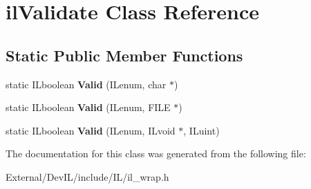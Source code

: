 \hypertarget{classilValidate}{
\section{ilValidate Class Reference}
\label{classilValidate}
}
\subsection*{Static Public Member Functions}
\begin{DoxyCompactItemize}
\item 
\hypertarget{classilValidate_a7a870c444e89b6dcbe05cf05a35f4911}{
static ILboolean {\bfseries Valid} (ILenum, char $\ast$)}
\label{classilValidate_a7a870c444e89b6dcbe05cf05a35f4911}

\item 
\hypertarget{classilValidate_ae3095a0f6efb478ac460725d44868145}{
static ILboolean {\bfseries Valid} (ILenum, FILE $\ast$)}
\label{classilValidate_ae3095a0f6efb478ac460725d44868145}

\item 
\hypertarget{classilValidate_a46b39f0121f6d2b49e2c552b1d820380}{
static ILboolean {\bfseries Valid} (ILenum, ILvoid $\ast$, ILuint)}
\label{classilValidate_a46b39f0121f6d2b49e2c552b1d820380}

\end{DoxyCompactItemize}


The documentation for this class was generated from the following file:\begin{DoxyCompactItemize}
\item 
External/DevIL/include/IL/il\_\-wrap.h\end{DoxyCompactItemize}
